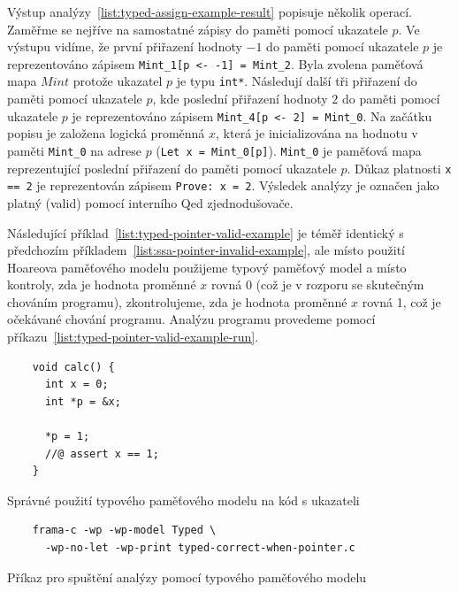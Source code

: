 Výstup analýzy~\ref{list:typed-assign-example-result} popisuje několik operací.
Zaměřme se nejříve na samostatné zápisy do paměti pomocí ukazatele $p$.
Ve výstupu vidíme, že první přiřazení hodnoty $-1$ do paměti pomocí ukazatele $p$
je reprezentováno zápisem \texttt{Mint\_1[p <- -1] = Mint\_2}.
Byla zvolena paměťová mapa $Mint$ protože ukazatel $p$ je typu \texttt{int*}.
Následují další tři přiřazení do paměti pomocí ukazatele $p$,
kde poslední přiřazení hodnoty $2$ do paměti pomocí ukazatele $p$ je reprezentováno zápisem
\texttt{Mint\_4[p <- 2] = Mint\_0}.
Na začátku popisu je založena logická proměnná $x$,
která je inicializována na hodnotu v paměti \texttt{Mint\_0} na adrese $p$ (\texttt{Let x = Mint\_0[p]}).
\texttt{Mint\_0} je paměťová mapa reprezentující poslední přiřazení do paměti pomocí ukazatele $p$.
Důkaz platnosti \texttt{x == 2} je reprezentován zápisem \texttt{Prove: x = 2}.
Výsledek analýzy je označen jako platný (valid) pomocí interního Qed zjednodušovače.

Následující příklad~\ref{list:typed-pointer-valid-example} je téměř identický
s předchozím příkladem~\ref{list:ssa-pointer-invalid-example},
ale místo použití Hoareova paměťového modelu použijeme typový paměťový model
a místo kontroly, zda je hodnota proměnné $x$ rovná 0 (což je v rozporu se skutečným chováním programu),
zkontrolujeme, zda je hodnota proměnné $x$ rovná 1, což je očekávané chování programu.
Analýzu programu provedeme pomocí příkazu~\ref{list:typed-pointer-valid-example-run}.

\begin{listing}[H]
    \begin{verbatim}
    void calc() {
      int x = 0;
      int *p = &x;

      *p = 1;
      //@ assert x == 1;
    }
    \end{verbatim}
    \caption{Správné použití typového paměťového modelu na kód s ukazateli}
    \label{list:typed-pointer-valid-example}
\end{listing}

\begin{listing}[H]
    \begin{verbatim}
    frama-c -wp -wp-model Typed \
      -wp-no-let -wp-print typed-correct-when-pointer.c
    \end{verbatim}
    \caption{Příkaz pro spuštění analýzy pomocí typového paměťového modelu}
    \label{list:typed-pointer-valid-example-run}
\end{listing}

